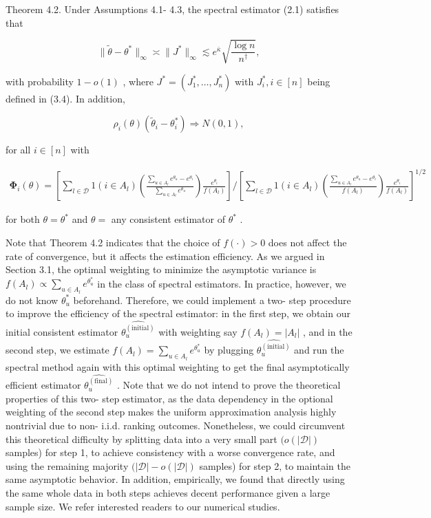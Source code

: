 Theorem 4.2. Under Assumptions 4.1- 4.3, the spectral estimator (2.1)
satisfies that

\[
\| \widetilde{\theta} -\theta^{*}\|_{\infty}\asymp \| J^{*}\|_{\infty}\lesssim e^{\bar{\kappa}}\sqrt{\frac{\log n}{n^{\dagger}}}, \tag{4.3}
\]

with probability \(1 - o(1)\) , where
\(J^{*} = (J_{1}^{*},\dots ,J_{n}^{*})\) with \(J_{i}^{*},i\in [n]\)
being defined in (3.4). In addition,

\[
\rho_{i}(\theta)(\widetilde{\theta}_{i} - \theta_{i}^{*})\Rightarrow N(0,1),
\]

for all \(i\in [n]\) with

\[
\begin{array}{r}{\mathbf{\Phi}_{i}(\theta) = \left[\sum_{l\in \mathcal{D}}1(i\in A_{l})\left(\frac{\sum_{u\in A_{l}}e^{\theta_{u}} - e^{\theta_{i}}}{\sum_{u\in A_{l}}e^{\theta_{u}}}\right)\frac{e^{\theta_{i}}}{f(A_{l})}\right] / \left[\sum_{l\in \mathcal{D}}1(i\in A_{l})\left(\frac{\sum_{u\in A_{l}}e^{\theta_{u}} - e^{\theta_{i}}}{f(A_{l})}\right)\frac{e^{\theta_{i}}}{f(A_{l})}\right]^{1 / 2}} \end{array}
\]

for both \(\theta = \theta^{*}\) and \(\theta =\) any consistent
estimator of \(\theta^{*}\) .

Note that Theorem 4.2 indicates that the choice of \(f(\cdot) > 0\) does
not affect the rate of convergence, but it affects the estimation
efficiency. As we argued in Section 3.1, the optimal weighting to
minimize the asymptotic variance is
\(f(A_{l})\propto \sum_{u\in A_{l}}e^{\theta_{u}^{*}}\) in the class of
spectral estimators. In practice, however, we do not know
\(\theta_{u}^{*}\) beforehand. Therefore, we could implement a two- step
procedure to improve the efficiency of the spectral estimator: in the
first step, we obtain our initial consistent estimator
\(\widehat{\theta_{u}^{(\mathrm{initial})}}\) with weighting say
\(f(A_{l}) = |A_{l}|\) , and in the second step, we estimate
\(f(A_{l}) = \sum_{u\in A_{l}}e^{\theta_{u}^{*}}\) by plugging
\(\widehat{\theta_{u}^{(\mathrm{initial})}}\) and run the spectral
method again with this optimal weighting to get the final asymptotically
efficient estimator \(\widehat{\theta_{u}^{(\mathrm{final})}}\) . Note
that we do not intend to prove the theoretical properties of this two-
step estimator, as the data dependency in the optional weighting of the
second step makes the uniform approximation analysis highly nontrivial
due to non- i.i.d. ranking outcomes. Nonetheless, we could circumvent
this theoretical difficulty by splitting data into a very small part
\((o(|\mathcal{D}|)\) samples) for step 1, to achieve consistency with a
worse convergence rate, and using the remaining majority
\((|\mathcal{D}| - o(|\mathcal{D}|)\) samples) for step 2, to maintain
the same asymptotic behavior. In addition, empirically, we found that
directly using the same whole data in both steps achieves decent
performance given a large sample size. We refer interested readers to
our numerical studies.

